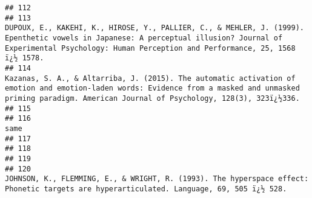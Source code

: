 \documentclass[
  english,
  man]{apa6}
\begin{document}
\begin{verbatim}
## 112                                                                                                                                                                                                                                                                                                                    
## 113                                                                                                DUPOUX, E., KAKEHI, K., HIROSE, Y., PALLIER, C., & MEHLER, J. (1999). Epenthetic vowels in Japanese: A perceptual illusion? Journal of Experimental Psychology: Human Perception and Performance, 25, 1568 ï¿½ 1578.
## 114                                                                                                       Kazanas, S. A., & Altarriba, J. (2015). The automatic activation of emotion and emotion-laden words: Evidence from a masked and unmasked priming paradigm. American Journal of Psychology, 128(3), 323ï¿½336.
## 115                                                                                                                                                                                                                                                                                                                    
## 116                                                                                                                                                                                                                                                                                                                same
## 117                                                                                                                                                                                                                                                                                                                    
## 118                                                                                                                                                                                                                                                                                                                    
## 119                                                                                                                                                                                                                                                                                                                    
## 120                                                                                                                                                                            JOHNSON, K., FLEMMING, E., & WRIGHT, R. (1993). The hyperspace effect: Phonetic targets are hyperarticulated. Language, 69, 505 ï¿½ 528.

\end{verbatim}
\end{document}
